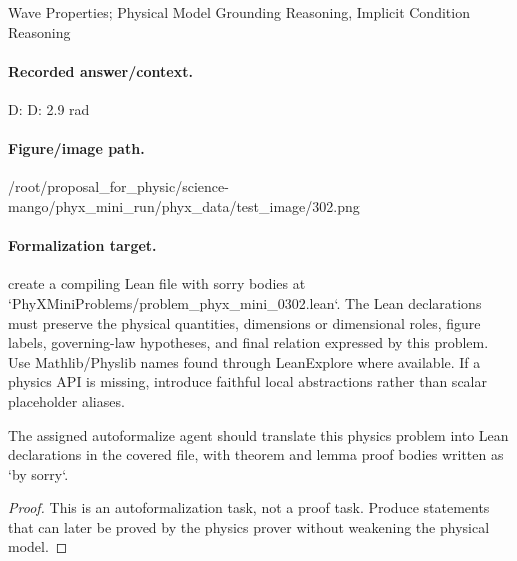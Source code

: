 Wave Properties; Physical Model Grounding Reasoning, Implicit Condition Reasoning

\paragraph{Recorded answer/context.}
D: D: 2.9 rad

\paragraph{Figure/image path.}
/root/proposal\_for\_physic/science-mango/phyx\_mini\_run/phyx\_data/test\_image/302.png

\paragraph{Formalization target.}
create a compiling Lean file with sorry bodies at `PhyXMiniProblems/problem\_phyx\_mini\_0302.lean`. The Lean declarations must preserve the physical quantities, dimensions or dimensional roles, figure labels, governing-law hypotheses, and final relation expressed by this problem.
Use Mathlib/Physlib names found through LeanExplore where available. If a physics API is missing, introduce faithful local abstractions rather than scalar placeholder aliases.

\begin{theorem}
\label{thm:physics:phyx_mini_0302:target}
The assigned autoformalize agent should translate this physics problem into Lean declarations in the covered file, with theorem and lemma proof bodies written as `by sorry`.
\end{theorem}
\begin{proof}
This is an autoformalization task, not a proof task. Produce statements that can later be proved by the physics prover without weakening the physical model.
\end{proof}

